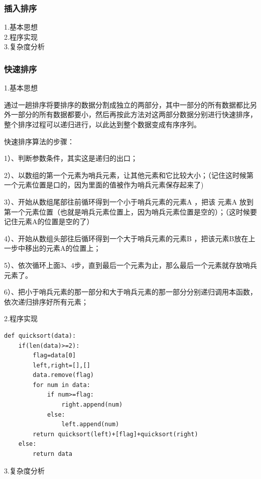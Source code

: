 \documentclass[UTF8]{ctexart}
\begin{document}
\subsubsection{插入排序}
1.基本思想\\
2.程序实现\\
3.复杂度分析\\
\subsubsection{快速排序}

1.基本思想

通过一趟排序将要排序的数据分割成独立的两部分，其中一部分的所有数据都比另外一部分的所有数据都要小，然后再按此方法对这两部分数据分别进行快速排序，整个排序过程可以递归进行，以此达到整个数据变成有序序列。

快速排序算法的步骤：

1）、判断参数条件，其实这是递归的出口；

2）、以数组的第一个元素为哨兵元素，让其他元素和它比较大小；（记住这时候第一个元素位置是口的，因为里面的值被作为哨兵元素保存起来了)

3）、开始从数组尾部往前循环得到一个小于哨兵元素的元素A ，把该  元素A  放到第一个元素位置（也就是哨兵元素位置上，因为哨兵元素位置是空的）；（这时候要记住元素A的位置是空的了）

4）、开始从数组头部往后循环得到一个大于哨兵元素的元素B ，把该元素B放在上一步中移出的元素A的位置上；

5）、依次循环上面3、4步，直到最后一个元素为止，那么最后一个元素就存放哨兵元素了。

6）、把小于哨兵元素的那一部分和大于哨兵元素的那一部分分别递归调用本函数，依次递归排序好所有元素；

2.程序实现

\begin{lstlisting}
def quicksort(data):
    if(len(data)>=2):
        flag=data[0]
        left,right=[],[]
        data.remove(flag)
        for num in data:
            if num>=flag:
                right.append(num)
            else:
                left.append(num)
        return quicksort(left)+[flag]+quicksort(right)
    else:
        return data
\end{lstlisting}

3.复杂度分析
\end{document}

